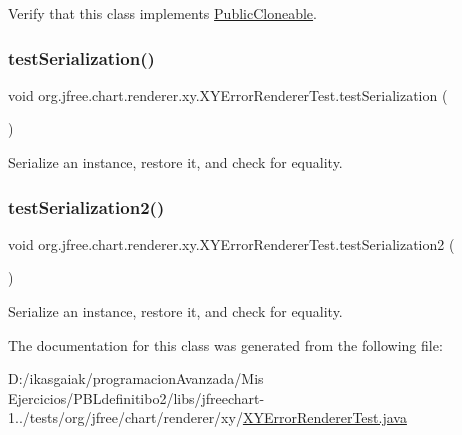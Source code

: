 Verify that this class implements \mbox{\hyperlink{}{Public\+Cloneable}}. \mbox{\label{classorg_1_1jfree_1_1chart_1_1renderer_1_1xy_1_1_x_y_error_renderer_test_a0c8934495114ad13a361858c9f4b2ac5}} 
\subsubsection{\texorpdfstring{test\+Serialization()}{testSerialization()}}
{\footnotesize\ttfamily void org.\+jfree.\+chart.\+renderer.\+xy.\+X\+Y\+Error\+Renderer\+Test.\+test\+Serialization (\begin{DoxyParamCaption}{ }\end{DoxyParamCaption})}

Serialize an instance, restore it, and check for equality. \mbox{\label{classorg_1_1jfree_1_1chart_1_1renderer_1_1xy_1_1_x_y_error_renderer_test_a46619f7f2b78a11f45cd1663deb32e75}} 
\subsubsection{\texorpdfstring{test\+Serialization2()}{testSerialization2()}}
{\footnotesize\ttfamily void org.\+jfree.\+chart.\+renderer.\+xy.\+X\+Y\+Error\+Renderer\+Test.\+test\+Serialization2 (\begin{DoxyParamCaption}{ }\end{DoxyParamCaption})}

Serialize an instance, restore it, and check for equality. 

The documentation for this class was generated from the following file\+:\begin{DoxyCompactItemize}
\item 
D\+:/ikasgaiak/programacion\+Avanzada/\+Mis Ejercicios/\+P\+B\+Ldefinitibo2/libs/jfreechart-\/1../tests/org/jfree/chart/renderer/xy/\mbox{\hyperlink{_x_y_error_renderer_test_8java}{X\+Y\+Error\+Renderer\+Test.\+java}}\end{DoxyCompactItemize}
